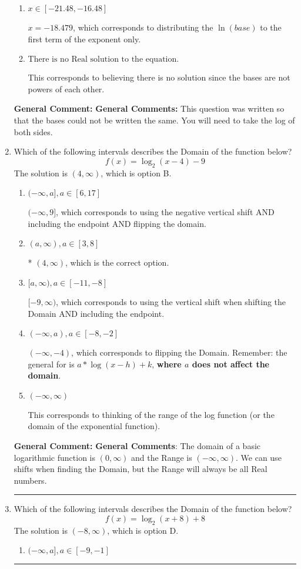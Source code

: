 \documentclass{extbook}[14pt]
\newcommand{\litem}[1]{\item #1

\rule{\textwidth}{0.4pt}}
\begin{document}
\begin{enumerate}
{\begin{enumerate}[label=\Alph*.]
* $x = -48.585$, which is the correct option.
\item \( x \in [-21.48, -16.48] \)

$x = -18.479$, which corresponds to distributing the $\ln(base)$ to the first term of the exponent only.
\item \( \text{There is no Real solution to the equation.} \)

This corresponds to believing there is no solution since the bases are not powers of each other.
\end{enumerate}

\textbf{General Comment:} \textbf{General Comments:} This question was written so that the bases could not be written the same. You will need to take the log of both sides.
}
\litem{
Which of the following intervals describes the Domain of the function below?
\[ f(x) = \log_2{(x-4)}-9 \]The solution is \( (4, \infty) \), which is option B.\begin{enumerate}[label=\Alph*.]
\item \( (-\infty, a], a \in [6, 17] \)

$(-\infty, 9]$, which corresponds to using the negative vertical shift AND including the endpoint AND flipping the domain.
\item \( (a, \infty), a \in [3, 8] \)

* $(4, \infty)$, which is the correct option.
\item \( [a, \infty), a \in [-11, -8] \)

$[-9, \infty)$, which corresponds to using the vertical shift when shifting the Domain AND including the endpoint.
\item \( (-\infty, a), a \in [-8, -2] \)

$(-\infty, -4)$, which corresponds to flipping the Domain. Remember: the general for is $a*\log(x-h)+k$, \textbf{where $a$ does not affect the domain}.
\item \( (-\infty, \infty) \)

This corresponds to thinking of the range of the log function (or the domain of the exponential function).
\end{enumerate}

\textbf{General Comment:} \textbf{General Comments}: The domain of a basic logarithmic function is $(0, \infty)$ and the Range is $(-\infty, \infty)$. We can use shifts when finding the Domain, but the Range will always be all Real numbers.
}
\litem{
Which of the following intervals describes the Domain of the function below?
\[ f(x) = \log_2{(x+8)}+8 \]The solution is \( (-8, \infty) \), which is option D.\begin{enumerate}[label=\Alph*.]
\item \( (-\infty, a], a \in [-9, -1] \)


\end{enumerate}}
\end{enumerate}
\end{document}
